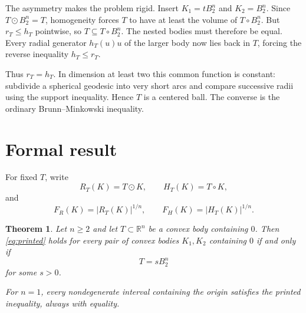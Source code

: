 \documentclass[11pt]{article}
\newtheorem{theorem}{Theorem}
\begin{document}
The asymmetry makes the problem rigid.  Insert $K_1=tB_2^n$ and
$K_2=B_2^n$.  Since $T\odot B_2^n=T$, homogeneity forces $T$ to have at least
the volume of $T\circ B_2^n$.  But $r_T\le h_T$ pointwise, so
$T\subseteq T\circ B_2^n$.  The nested bodies must therefore be equal.
Every radial generator $h_T(u)u$ of the larger body now lies back in $T$,
forcing the reverse inequality $h_T\le r_T$.

Thus $r_T=h_T$.  In dimension at least two this common function is constant:
subdivide a spherical geodesic into very short arcs and compare successive
radii using the support inequality.  Hence $T$ is a centered ball.  The
converse is the ordinary Brunn--Minkowski inequality.

\section{Formal result}

For fixed $T$, write
\[
 R_T(K)=T\odot K,\qquad H_T(K)=T\circ K,
\]
and
\[
 F_R(K)=|R_T(K)|^{1/n},\qquad F_H(K)=|H_T(K)|^{1/n}.
\]

\begin{theorem}\label{thm:classification}
Let $n\ge2$ and let $T\subset\mathbb R^n$ be a convex body containing $0$.
Then \eqref{eq:printed} holds for every pair of convex bodies $K_1,K_2$
containing $0$ if and only if
\[
 T=sB_2^n
\]
for some $s>0$.

For $n=1$, every nondegenerate interval containing the origin satisfies the
printed inequality, always with equality.
\end{theorem}
\end{document}
